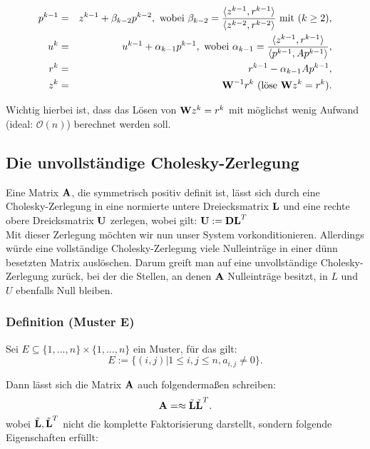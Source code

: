 \begin{eqnarray}
p^{k-1} &=& z^{k-1} + \beta_{k-2}p^{k-2}, \textnormal{ wobei } \beta_{k-2} = \frac {\langle z^{k-1}, r^{k-1} \rangle} {\langle z^{k-2}, r^{k-2} \rangle} \textnormal{ mit } (k \ge 2), \notag \\
u^{k} &=& u^{k-1} + \alpha_{k-1}p^{k-1}, \textnormal{ wobei } \alpha_{k-1} = \frac {\langle z^{k-1}, r^{k-1} \rangle} {\langle p^{k-1}, Ap^{k-1} \rangle}, \notag \\
r^{k} &=& r^{k-1} - \alpha_{k-1}Ap^{k-1}, \notag \\
z^{k} &=& {\textbf{W}}^{-1}r^{k} \textnormal{ (löse } {\textbf{W}}z^{k} = r^{k}). \notag
\end{eqnarray}

Wichtig hierbei ist, dass das Lösen von ${\textbf{W}}z^{k} = r^{k}$ mit möglichst wenig Aufwand (ideal: $\mathcal{O}(n)$) berechnet werden soll.

\subsection{Die unvollständige Cholesky-Zerlegung}\label{ss.ICCG}

Eine Matrix ${\textbf{A}}$, die symmetrisch positiv definit ist, lässt sich durch eine Cholesky-Zerlegung in eine normierte untere Dreiecksmatrix ${\textbf{L}}$ und eine rechte obere Dreicksmatrix ${\textbf{U}}$ zerlegen, wobei gilt: ${\textbf{U}} := {\textbf{D}}{\textbf{L}}^{T}$ \\
Mit dieser Zerlegung möchten wir nun unser System vorkonditionieren. Allerdings würde eine vollständige Cholesky-Zerlegung viele Nulleinträge in einer dünn besetzten Matrix auslöschen. Darum greift man auf eine unvollständige Cholesky-Zerlegung zurück, bei der die Stellen, an denen ${\textbf{A}}$ Nulleinträge besitzt, in $L$ und $U$ ebenfalls Null bleiben.

\subsubsection{Definition (Muster E)}\label{sss.Muster E}

Sei $E \subseteq \{1,...,n\} \times \{1,...,n\}$ ein Muster, für das gilt:
\begin{equation}
E := \{(i,j) | 1 \le i,j \le n, a_{i,j} \ne 0 \}.
\end{equation}

Dann lässt sich die Matrix ${\textbf{A}}$ auch folgendermaßen schreiben:
\begin{equation}
{\textbf{A}} = \approx \tilde{{\textbf{L}}} \tilde{{\textbf{L}}}^{T}.
\end{equation}
wobei $\tilde{{\textbf{L}}}, \tilde{{\textbf{L}}}^{T}$ nicht die komplette Faktorisierung darstellt, sondern folgende Eigenschaften erfüllt:

